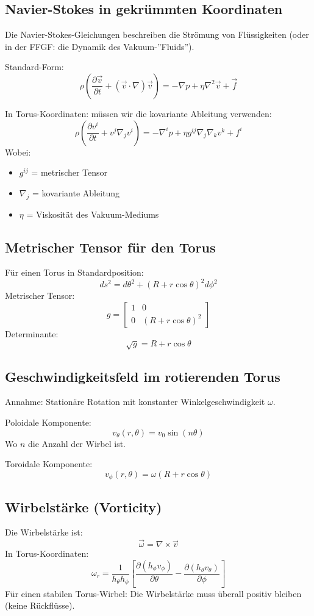 \documentclass[12pt,a4paper]{article}
\begin{document}
	\subsection{Navier-Stokes in gekrümmten Koordinaten}
	Die Navier-Stokes-Gleichungen beschreiben die Strömung von Flüssigkeiten (oder in der FFGF: die Dynamik des Vakuum-''Fluids'').
	
	Standard-Form:
	\[
	\rho\left(\frac{\partial \vec{v}}{\partial t} + (\vec{v} \cdot \nabla) \vec{v}\right) = -\nabla p + \eta \nabla^2 \vec{v} + \vec{f}
	\]
	
	In Torus-Koordinaten: müssen wir die kovariante Ableitung verwenden:
	\[
	\rho\left(\frac{\partial v^i}{\partial t} + v^j \nabla_j v^i\right) = -\nabla^i p + \eta g^{ij} \nabla_j \nabla_k v^k + f^i
	\]
	Wobei:
	\begin{itemize}
		\item \( g^{ij} \) = metrischer Tensor
		\item \( \nabla_j \) = kovariante Ableitung
		\item \( \eta \) = Viskosität des Vakuum-Mediums
	\end{itemize}
	
	\subsection{Metrischer Tensor für den Torus}
	Für einen Torus in Standardposition:
	\[
	ds^2 = d\theta^2 + (R + r \cos \theta)^2 d\phi^2
	\]
	Metrischer Tensor:
	\[
	g = \begin{bmatrix}
		1 & 0 \\
		0 & (R + r \cos \theta)^2
	\end{bmatrix}
	\]
	Determinante:
	\[
	\sqrt{g} = R + r \cos \theta
	\]
	
	\subsection{Geschwindigkeitsfeld im rotierenden Torus}
	Annahme: Stationäre Rotation mit konstanter Winkelgeschwindigkeit \( \omega \).
	
	Poloidale Komponente:
	\[
	v_\theta(r, \theta) = v_0 \sin(n \theta)
	\]
	Wo \( n \) die Anzahl der Wirbel ist.
	
	Toroidale Komponente:
	\[
	v_\phi(r, \theta) = \omega (R + r \cos \theta)
	\]
	
	\subsection{Wirbelstärke (Vorticity)}
	Die Wirbelstärke ist:
	\[
	\vec{\omega} = \nabla \times \vec{v}
	\]
	In Torus-Koordinaten:
	\[
	\omega_r = \frac{1}{h_\theta h_\phi} \left[ \frac{\partial (h_\phi v_\phi)}{\partial \theta} - \frac{\partial (h_\theta v_\theta)}{\partial \phi} \right]
	\]
	Für einen stabilen Torus-Wirbel: Die Wirbelstärke muss überall positiv bleiben (keine Rückflüsse).
	
\end{document}
